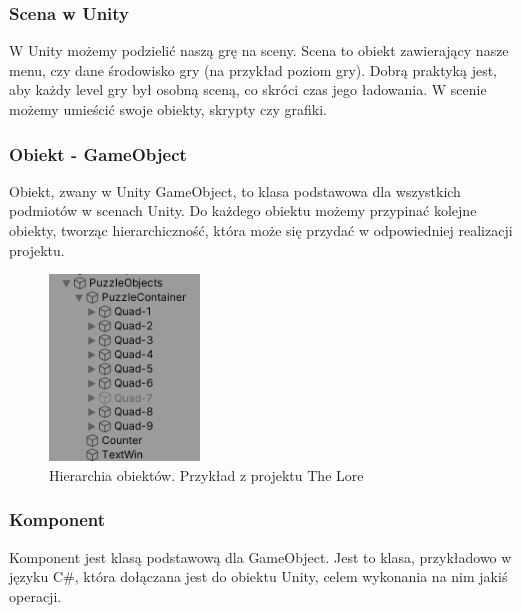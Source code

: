 \documentclass[oneside,polski,logo]{amuthesis}
\begin{document}
\subsubsection{Scena w Unity}
W Unity możemy podzielić naszą grę na sceny. Scena to obiekt zawierający nasze menu, czy dane środowisko gry (na przykład poziom gry). Dobrą praktyką jest, aby każdy level gry był osobną sceną, co skróci czas jego ładowania. W scenie możemy umieścić swoje obiekty, skrypty czy grafiki. \cite{scena}
\subsubsection{Obiekt - GameObject}
\label{sec:gameobject}
Obiekt, zwany w Unity GameObject, to klasa podstawowa dla wszystkich podmiotów w scenach Unity. Do każdego obiektu możemy przypinać kolejne obiekty, tworząc hierarchiczność, która może się przydać w odpowiedniej realizacji projektu. \cite{gameobject}
\begin{figure}[h]
	\centering
	\includegraphics[width=4cm]{images/tyrek/hierarchia.png}
	\caption{Hierarchia obiektów. Przykład z projektu The Lore}
\end{figure}
\subsubsection{Komponent}
\label{sec:komponent}
Komponent jest klasą podstawową dla GameObject. Jest to klasa, przykładowo w języku C\#, która dołączana jest do obiektu Unity, celem wykonania na nim jakiś operacji. \cite{komponent}
\end{document}
